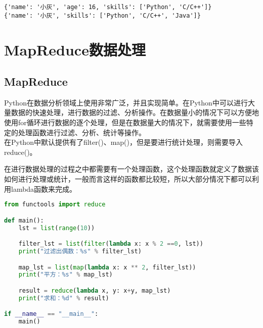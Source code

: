 \begin{tcolorbox}
    \begin{verbatim}
{'name': '小灰', 'age': 16, 'skills': ['Python', 'C/C++']}
{'name': '小灰', 'skills': ['Python', 'C/C++', 'Java']}
\end{verbatim}
\end{tcolorbox}

\newpage

\section{MapReduce数据处理}

\subsection{MapReduce}

Python在数据分析领域上使用非常广泛，并且实现简单。在Python中可以进行大量数据的快速处理，进行数据的过滤、分析操作。在数据量小的情况下可以方便地使用for循环进行数据的逐个处理，但是在数据量大的情况下，就需要使用一些特定的处理函数进行过滤、分析、统计等操作。\\

在Python中默认提供有了filter()、map()，但是要进行统计处理，则需要导入reduce()。

\begin{table}[H]
    \centering
    \caption{MapReduce数据处理函数}
\end{table}

在进行数据处理的过程之中都需要有一个处理函数，这个处理函数就定义了数据该如何进行处理或统计，一般而言这样的函数都比较短，所以大部分情况下都可以利用lambda函数来完成。\\


\begin{lstlisting}[language=Python]
from functools import reduce

def main():
    lst = list(range(10))

    filter_lst = list(filter(lambda x: x % 2 ==0, lst))
    print("过滤出偶数：%s" % filter_lst)

    map_lst = list(map(lambda x: x ** 2, filter_lst))
    print("平方：%s" % map_lst)

    result = reduce(lambda x, y: x+y, map_lst)
    print("求和：%d" % result)

if __name__ == "__main__":
    main()
\end{lstlisting}

